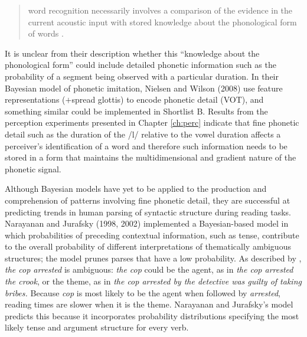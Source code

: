 \begin{quote}
word recognition necessarily involves a comparison of the evidence in the current acoustic input with stored knowledge about the phonological form of words \cite[379]{norrismcqueen2008}.
\end{quote}

\noindent  It is unclear from their description whether this ``knowledge about the phonological form'' could include detailed phonetic information such as the probability of a segment being observed with a particular duration.  In their Bayesian model of phonetic imitation, Nielsen and Wilson (2008) use feature representations ($+$spread glottis) to encode phonetic detail (VOT), and something similar could be implemented in Shortlist B. Results from the perception experiments presented in Chapter \ref{ch:perc} indicate that fine phonetic detail such as the duration of the /l/ relative to the vowel duration affects a perceiver's identification of a word and therefore such information needs to be stored in a form that maintains the multidimensional and gradient nature of the phonetic signal.

Although Bayesian models have yet to be applied to the production and comprehension of patterns involving fine phonetic detail, they are successful at predicting trends in human parsing of syntactic structure during reading tasks.   Narayanan and Jurafsky (1998, 2002) implemented a Bayesian-based model in which probabilities of preceding contextual information, such as tense, contribute to the overall probability of different interpretations of thematically ambiguous structures; the model prunes parses that have a low probability.  As described by , \textit{the cop arrested} is ambiguous: \textit{the cop} could be the agent, as in \textit{the cop arrested the crook}, or the theme, as in \textit{the cop arrested by the detective was guilty of taking bribes.}  Because \textit{cop} is most likely to be the agent when followed by \textit{arrested}, reading times are slower when it is the theme. Narayanan and Jurafsky's model predicts this because it incorporates probability distributions specifying the most likely tense and argument structure for every verb. \nocite{narayananjurafsky1998} \nocite{narayananjurafsky2002}
  
